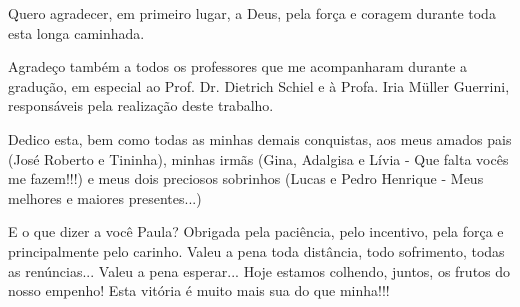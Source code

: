 Quero agradecer, em primeiro lugar, a Deus, pela força e coragem durante toda esta longa caminhada.

Agradeço também a todos os professores que me acompanharam durante a gradução, em especial ao Prof. Dr. Dietrich Schiel e à Profa. Iria Müller Guerrini, responsáveis pela realização deste trabalho.

Dedico esta, bem como todas as minhas demais conquistas, aos meus amados pais (José Roberto e Tininha), minhas irmãs (Gina, Adalgisa e Lívia - Que falta vocês me fazem!!!) e meus dois preciosos sobrinhos (Lucas e Pedro Henrique - Meus melhores e maiores presentes...)

E o que dizer a você Paula? 
Obrigada pela paciência, pelo incentivo, pela força e principalmente pelo carinho. 
Valeu a pena toda distância, todo sofrimento, todas as renúncias... Valeu a pena esperar... Hoje estamos colhendo, juntos, os frutos do nosso empenho!
Esta vitória é muito mais sua do que minha!!!